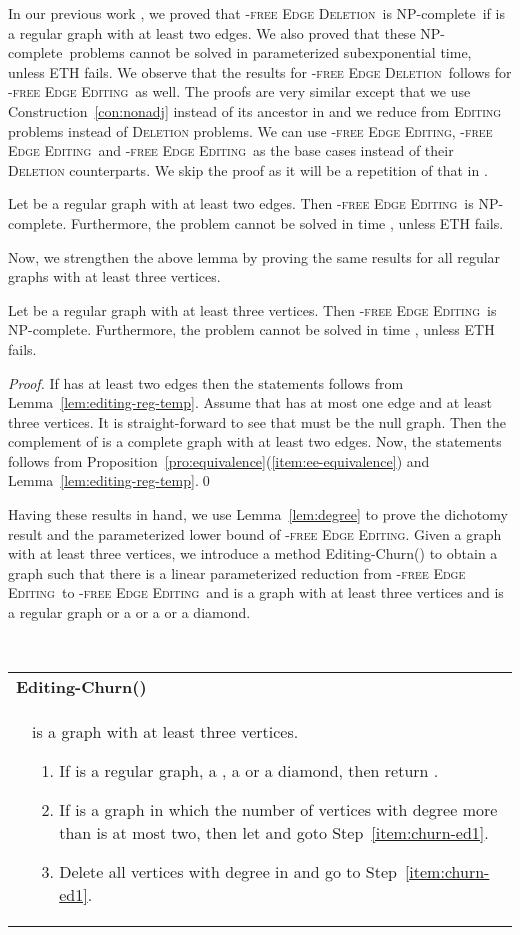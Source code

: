 \documentclass[envcountsame,envcountsect,10pt,oribibl]{llncs}
\newcommand{\pname}[1]{\textnormal{\textsc{#1}}}
\newcommand{\cclass}[1]{\textnormal{\textsf{#1}}}
\newcommand{\HEE}{\pname{-free Edge Editing}}
\newcommand{\HDEE}{\pname{-free Edge Editing}}
\newcommand{\RED}{\pname{-free Edge Deletion}}
\newcommand{\REE}{\pname{-free Edge Editing}}
\newcommand{\PTEE}{\pname{-free Edge Editing}}
\newcommand{\CLEE}{\pname{-free Edge Editing}}
\newcommand{\TWKTEE}{\pname{-free Edge Editing}}
\newcommand{\NPC}{\cclass{NP-complete}}
\newcommand{\defstage}[2]{\hfill\\\smallskip\noindent \begin{tabularx}{\textwidth}{|l X|}\hline \multicolumn{2}{|l|}{\textbf{#1}}\\&#2\\\hline \end{tabularx}}
\begin{document}
In our previous work \cite{DBLP:conf/cocoa/AravindSS15},
we proved that \RED\ is \NPC\ if  is a regular graph
with at least two edges. We also proved that these
\NPC\ problems cannot be solved in parameterized 
subexponential time, unless ETH fails.
We observe that the results for \RED\ follows for
\REE\ as well. The proofs are very similar except
that we use Construction~\ref{con:nonadj} instead of its
ancestor in \cite{DBLP:conf/cocoa/AravindSS15} and we
reduce from \textsc{Editing} problems instead of \textsc{Deletion}
problems. We can use \PTEE, \CLEE\ and \TWKTEE\ as the base cases instead of their
\textsc{Deletion} counterparts.
We skip the proof as it will 
be a repetition of that in \cite{DBLP:conf/cocoa/AravindSS15}.

\begin{lemma}
  \label{lem:editing-reg-temp}
  Let  be a regular graph with at least two edges.
  Then \REE\ is \NPC. Furthermore, the problem cannot be
  solved in time , unless ETH fails.
\end{lemma}

Now, we strengthen the above lemma by proving the same results for all 
regular graphs with at least three vertices.

\begin{lemma}
  \label{lem:editing-reg}
  Let  be a regular graph with at least three vertices.
  Then \REE\ is \NPC. Furthermore, the problem cannot be
  solved in time , unless ETH fails.
\end{lemma}
\begin{proof}
  If  has at least two edges then the statements follows from 
  Lemma~\ref{lem:editing-reg-temp}. Assume that
   has at most one edge and at least three vertices. It is 
  straight-forward to see that  must be the null graph.
  Then the complement of  is a complete graph with at least two edges. 
  Now, the statements follows from Proposition~\ref{pro:equivalence}(\ref{item:ee-equivalence})
  and Lemma~\ref{lem:editing-reg-temp}.\qed
\end{proof}

Having these results in hand, we use Lemma~\ref{lem:degree} to prove the 
dichotomy result and the parameterized lower bound of \HEE.
Given a graph  with at least three vertices, we introduce a method 
Editing-Churn() to 
obtain a graph  such that there is a linear parameterized reduction
from \HDEE\ to \HEE\ and  is a graph with at least three vertices
and is a regular graph or a  or a  or a diamond.

\defstage{Editing-Churn()}
{  is a graph with at least three vertices.
  \begin{enumerate}[Step 1:]
    \item\label{item:churn-ed1} If  is a regular graph, a , a  or a diamond, then return .
    \item\label{item:churn-ed2} If  is a graph in which the number of vertices with degree more than 
      is at most two, then let  and goto Step~\ref{item:churn-ed1}.
    \item\label{item:churn-ed3} Delete all vertices with degree  in  and go to Step~\ref{item:churn-ed1}.
  \end{enumerate}
}
\end{document}
